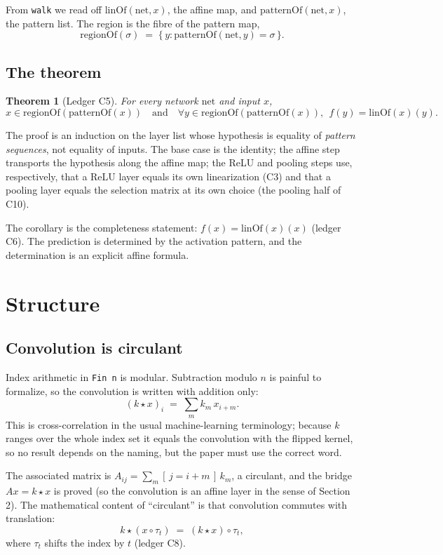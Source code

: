 \documentclass[11pt]{article}
\newtheorem{theorem}{Theorem}
\newcommand{\code}[1]{\texttt{#1}}
\newcommand{\LinOf}{\mathrm{linOf}}
\newcommand{\PatOf}{\mathrm{patternOf}}
\newcommand{\RegOf}{\mathrm{regionOf}}
\begin{document}
From \code{walk} we read off $\LinOf(\mathrm{net}, x)$, the affine map, and
$\PatOf(\mathrm{net}, x)$, the pattern list. The region is the fibre of the
pattern map,
\[
  \RegOf(\sigma) \;=\; \{\, y : \PatOf(\mathrm{net}, y) = \sigma \,\}.
\]

\subsection{The theorem}

\begin{theorem}[Ledger C5]
For every network $\mathrm{net}$ and input $x$,
\[
  x \in \RegOf(\PatOf(x)) \quad\text{and}\quad
  \forall y \in \RegOf(\PatOf(x)),\ \ f(y) = \LinOf(x)(y).
\]
\end{theorem}

The proof is an induction on the layer list whose hypothesis is equality of
\emph{pattern sequences}, not equality of inputs. The base case is the identity;
the affine step transports the hypothesis along the affine map; the ReLU and
pooling steps use, respectively, that a ReLU layer equals its own
linearization (C3) and that a pooling layer equals the selection matrix at its
own choice (the pooling half of C10).

The corollary is the completeness statement: $f(x) = \LinOf(x)(x)$ (ledger C6).
The prediction is determined by the activation pattern, and the determination
is an explicit affine formula.

\section{Structure}\label{sec:structure}

\subsection{Convolution is circulant}

Index arithmetic in \code{Fin n} is modular. Subtraction modulo $n$ is painful
to formalize, so the convolution is written with addition only:
\[
  (k \star x)_i \;=\; \sum_{m} k_m\, x_{i+m}.
\]
This is cross-correlation in the usual machine-learning terminology; because
$k$ ranges over the whole index set it equals the convolution with the flipped
kernel, so no result depends on the naming, but the paper must use the correct
word.

The associated matrix is $A_{ij} = \sum_m [\,j = i+m\,]\, k_m$, a circulant,
and the bridge $A x = k \star x$ is proved (so the convolution is an affine
layer in the sense of Section 2). The mathematical content of ``circulant'' is
that convolution commutes with translation:
\[
  k \star (x \circ \tau_t) \;=\; (k \star x) \circ \tau_t ,
\]
where $\tau_t$ shifts the index by $t$ (ledger C8).
\end{document}
